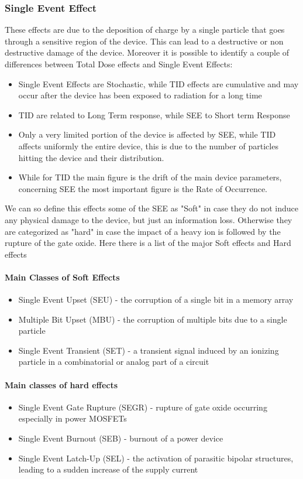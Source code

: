 \documentclass[./dissertation.tex]{subfiles}
\begin{document}
\subsubsection{Single Event Effect}
These effects are due to the deposition of charge by a single particle that goes through a sensitive region of the device. This can lead to a destructive or non destructive damage of the device.
Moreover it is possible to identify a couple of differences between Total Dose effects and Single Event Effects:
\begin{itemize}
    \item Single Event Effects are Stochastic, while TID effects are cumulative and may occur after the device has been exposed to radiation for a long time
    \item TID are related to Long Term response, while SEE to Short term Response
    \item Only a very limited portion of the device is affected by SEE, while TID affects uniformly the entire device, this is due to the number of particles hitting the device and their distribution.
    \item While for TID the main figure is the drift of the main device parameters, concerning SEE the most important figure is the Rate of Occurrence.
\end{itemize}

We can so define this effects some of the SEE as "Soft" in case they do not induce any physical damage to the device, but just an information loss. Otherwise they are categorized as "hard" in case the impact of a heavy ion is followed by the rupture of the gate oxide. Here there is a list of the major Soft effects and Hard effects
\paragraph{Main Classes of Soft Effects}
\begin{itemize}
    \item Single Event Upset (SEU) - the corruption of a single bit in a memory array
    \item Multiple Bit Upset (MBU) - the corruption of multiple bits due to a single particle
    \item Single Event Transient (SET) - a transient signal induced by an ionizing particle in a combinatorial or analog part of a circuit
\end{itemize}
\paragraph{Main classes of hard effects}
\begin{itemize}
    \item Single Event Gate Rupture (SEGR) - rupture of gate oxide occurring especially in power MOSFETs
    \item Single Event Burnout (SEB) - burnout of a power device
    \item Single Event Latch-Up (SEL) - the activation of parasitic bipolar structures, leading to a sudden increase of the supply current
\end{itemize}
\end{document}
